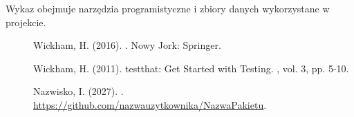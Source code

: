 \wykazzrodel

%

Wykaz obejmuje narzędzia programistyczne i zbiory danych wykorzystane w projekcie.

\begin{description}
\item[] Wickham, H. (2016). . Nowy Jork: Springer.
\item[] Wickham, H. (2011). testthat: Get Started with Testing. , vol. 3, pp. 5-10.
\item[] Nazwisko, I. (2027). . \url{https://github.com/nazwauzytkownika/NazwaPakietu}.
\end{description}
